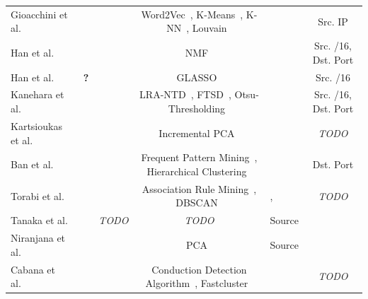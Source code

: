 \documentclass[manuscript,nonacm]{acmart}
\newcommand{\markA}{\ding{66}}%
\newcommand{\markB}{\ding{71}}%
\newcommand{\markD}{\ding{168}}%
\newcommand{\markE}{\ding{169}}%
\newcommand{\markF}{\ding{170}}%
\newcommand{\markG}{\ding{171}}%
\newcommand{\markH}{\ding{92}}%
\newcommand{\markJ}{\ding{166}}%
\newcommand{\markX}{\Sagittarius} %
\newcommand{\markEtc}{\textbf{?}}
\begin{document}
\begin{table}[]
\begin{tabular}{lllclc}
            Gioacchini et al.~\cite{2021gioacchini,2023gioacchini} & \markX                    & \markA\markB  & Word2Vec~\cite{2013mikolov}, K-Means~\cite{1967macqueen}, K-NN~\cite{1967cover,1989fix}, Louvain~\cite{2006newman,2008blondel} & \markF & Src. IP   \\
            Han et al.~\cite{2021han,2022han}                      & \markX                    & \markA        & NMF~\cite{2000lee}    & \markG & Src. /16, Dst. Port \\
            Han et al.~\cite{2020han,2022han}                      & \markX\markEtc            & \markA        & GLASSO~\cite{2008friedman} & \markG & Src. /16  \\
            Kanehara et al.~\cite{2019kanehara,2022han}            & \markX                    & \markA\markH  & LRA-NTD~\cite{2015zhou}, FTSD~\cite{2010caiafa}, Otsu-Thresholding~\cite{1979otsu}          & \markG & Src. /16, Dst. Port \\
            Kartsioukas et al.~\cite{2023kartsioukas}              & \markX                    & \markA\markH  & Incremental PCA~\cite{2012arora} & \markG & \textit{TODO} \\
            Ban et al.~\cite{2016ban}                              & \markX                    & \markA        & Frequent Pattern Mining~\cite{2000han,2007han}, Hierarchical Clustering~\cite{2012murtagh}  & \markF\markG & Dst. Port \\ 
            Torabi et al.~\cite{2020torabi,2018torabi}             & \markX                    & \markJ        & Association Rule Mining~\cite{1993agrawal}, DBSCAN~\cite{1996ester} & \markD,\markE & \textit{TODO} \\
            Tanaka et al.~\cite{2023tanaka,2021tanaka}             & \markX                    & \textit{TODO} & \textit{TODO} & Source \\
            Niranjana et al.~\cite{2019niranjana}                  & \markX                    & \markA\markB  & PCA~\cite{1901pearson,1993hotelling} &  Source \\
            Cabana et al.~\cite{2019cabana}                        & \markX                    & \markB\markH  & Conduction Detection Algorithm~\cite{2015lu}, Fastcluster~\cite{2013mullner} & \markD\markE & \textit{TODO} \\

\end{tabular}
\end{table}
\end{document}
